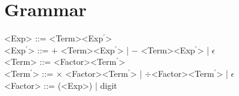 \documentclass[10pt,letterpaper]{article}
\begin{document}
\section{Grammar}

<Exp> ::= <Term><Exp$^{\prime}$>\\
<Exp$^{\prime}$> ::= $+$ <Term><Exp$^{\prime}$> | $-$ <Term><Exp$^{\prime}$> | $\epsilon$\\
<Term> ::= <Factor><Term$^{\prime}$>\\
<Term$^\prime$> ::= $\times$ <Factor><Term$^{\prime}$> | $\div$<Factor><Term$^{\prime}$> | $\epsilon$\\
<Factor> ::= (<Exp>) | digit
\end{document}
